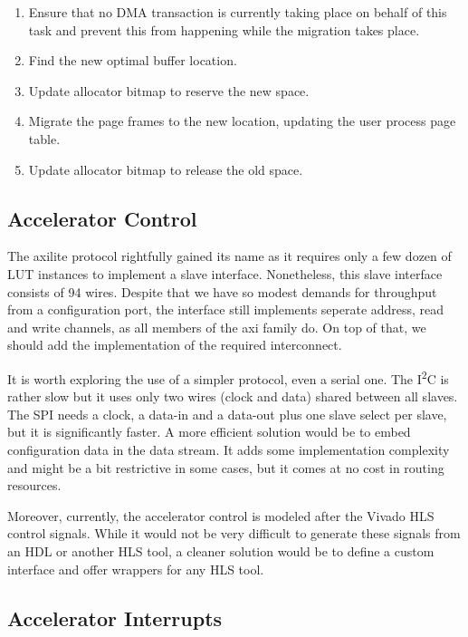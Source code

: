 \begin{enumerate}
\item	Ensure that no DMA transaction is currently taking place on behalf of this task 
	and prevent this from happening while the migration takes place.
\item	Find the new optimal buffer location.
\item	Update allocator bitmap to reserve the new space.
\item	Migrate the page frames to the new location, updating the user process page table.
\item	Update allocator bitmap to release the old space.
\end{enumerate}


\subsection{Accelerator Control}

The \gls{axilite} protocol rightfully gained its name as it requires only a few dozen of LUT instances to implement a slave interface.
Nonetheless, this slave interface consists of 94 wires. Despite that we have so modest demands for throughput from a configuration
port, the interface still implements seperate address, read and write channels, as all members of the \gls{axi} family do.
On top of that, we should add the implementation of the required interconnect.

It is worth exploring the use of a simpler protocol, even a serial one. The I\textsuperscript{2}C is rather slow but it uses only
two wires (clock and data) shared between all slaves. The SPI needs a clock, a data-in and a data-out plus one slave select per slave,
but it is significantly faster.
A more efficient solution would be to embed configuration data in the data stream. It adds some implementation complexity
and might be a bit restrictive in some cases, but it comes at no cost in routing resources.

Moreover, currently, the accelerator control is modeled after the Vivado HLS control signals. 
While it would not be very difficult to generate these signals from an HDL or another HLS tool,
a cleaner solution would be to define a custom interface and offer wrappers for any HLS tool.

\subsection{Accelerator Interrupts}

